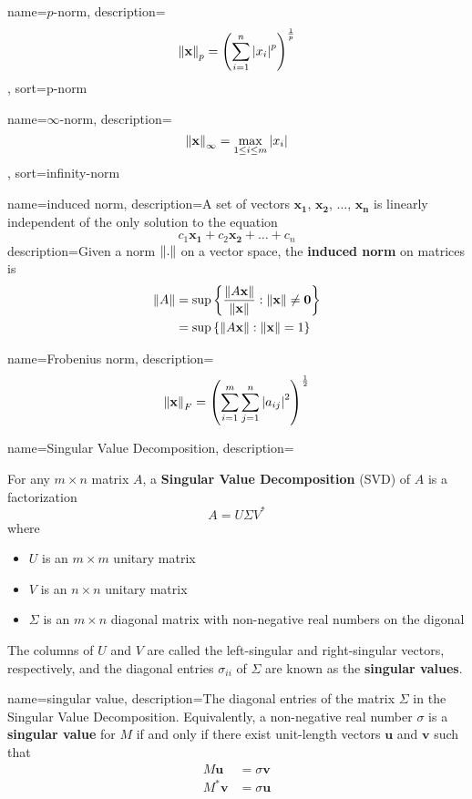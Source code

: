 {
        name={\ensuremath{p}-norm},
        description={\[\left\lVert\mathbf{x}\right\rVert_p=\left(\sum_{i=1}^n\left|x_i\right|^p\right)^{\frac{1}{p}}\]
        },
        sort=p-norm
}

{
        name={\ensuremath{\infty}-norm},
        description={\[\left\lVert\mathbf{x}\right\rVert_{\infty}=\max_{1\leq i\leq m}\left|x_i\right|\]
                },
        sort=infinity-norm
}

{
        name=induced norm,
        description={A set of vectors \(\mathbf{x_1}\), \(\mathbf{x_2}\), \(\hdots\), \(\mathbf{x_n}\) is linearly independent of the only solution to the equation \[c_1\mathbf{x_1}+c_2\mathbf{x_2}+\hdots+c_n\]}
        description={Given a norm \(\left\lVert.\right\rVert\) on a vector space, the \textbf{induced norm} on matrices is
        \begin{align*}\left\lVert A\right\rVert
                & =\sup\left\{\frac{\left\lVert A\mathbf{x}\right\rVert}{\left\lVert\mathbf{x}\right\rVert}:\left\lVert\mathbf{x}\right\rVert\neq\mathbf{0}\right\} \\
                & =\sup\left\{\left\lVert A\mathbf{x}\right\rVert:\left\lVert\mathbf{x}\right\rVert=1\right\}
        \end{align*}}
}

{
        name=Frobenius norm,
        description={\[\left\lVert\mathbf{x}\right\rVert_F=\left(\sum_{i=1}^m\sum_{j=1}^n\left|a_{ij}\right|^2\right)^{\frac{1}{2}}\]}
}

{
        name=Singular Value Decomposition,
        description={For any \(m\times n\) matrix \(A\), a \textbf{Singular Value Decomposition} (SVD) of \(A\) is a factorization \[A=U\Sigma V^*\] where
                        \begin{itemize}
                                \item \(U\) is an \(m\times m\) unitary matrix
                                \item \(V\) is an \(n\times n\) unitary matrix
                                \item \(\Sigma\) is an \(m\times n\) diagonal matrix with non-negative real numbers on the digonal
                        \end{itemize}
                        The columns of \(U\) and \(V\) are called the left-singular and right-singular vectors, respectively, and the diagonal entries \(\sigma_{ii}\) of \(\Sigma\) are known as the \textbf{singular values}.}
}

{
        name=singular value,
                description={The diagonal entries of the matrix \(\Sigma\) in the Singular Value Decomposition. Equivalently, a non-negative real number \(\sigma\) is a \textbf{singular value} for \(M\) if and only if there exist unit-length vectors \(\mathbf{u}\) and \(\mathbf{v}\) such that \begin{align*}M\mathbf{u}&=\sigma\mathbf{v}\\M^*\mathbf{v}&=\sigma\mathbf{u}\end{align*}}
}

